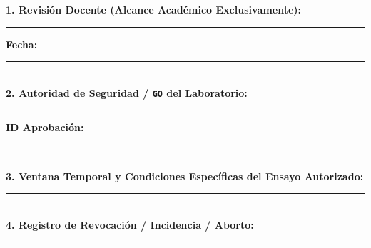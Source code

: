 \documentclass[10pt, a4paper, landscape]{article}
\begin{document}
\vspace{0.3cm}
\begin{tcolorbox}[colback=red!5, colframe=red!80!black, title=\textbf{Bloque de Firmas Independientes (Vacío por Defecto — Este Documento No Concede Permiso de Movimiento)}, left=2.5mm, right=2.5mm, top=1.5mm, bottom=1.5mm]
    \footnotesize\raggedright
    \textbf{1. Revisión Docente (Alcance Académico Exclusivamente):} \rule{6.5cm}{0.15mm} \hfill \textbf{Fecha:} \rule{3cm}{0.15mm}\\[0.28cm]
    \textbf{2. Autoridad de Seguridad / \texttt{GO} del Laboratorio:} \rule{6.8cm}{0.15mm} \hfill \textbf{ID Aprobación:} \rule{3.5cm}{0.15mm}\\[0.28cm]
    \textbf{3. Ventana Temporal y Condiciones Específicas del Ensayo Autorizado:} \rule{11.5cm}{0.15mm}\\[0.28cm]
    \textbf{4. Registro de Revocación / Incidencia / Aborto:} \rule{13.5cm}{0.15mm}
\end{tcolorbox}
\end{document}
